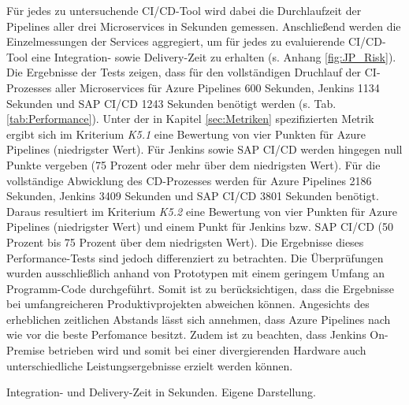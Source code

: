 \vspace*{-15mm}
Für jedes zu untersuchende CI/CD-Tool wird dabei die Durchlaufzeit der Pipelines aller drei Microservices in Sekunden gemessen. Anschließend werden die Einzelmessungen der Services aggregiert, um für jedes zu evaluierende CI/CD-Tool eine Integration- sowie Delivery-Zeit zu erhalten (s. Anhang \ref{fig:JP_Risk}). Die Ergebnisse der Tests zeigen, dass für den vollständigen Druchlauf der CI-Prozesses aller Microservices für Azure Pipelines 600 Sekunden, Jenkins 1134 Sekunden und SAP CI/CD 1243 Sekunden benötigt werden (s. Tab. \ref{tab:Performance}). Unter der in Kapitel \ref{sec:Metriken} spezifizierten Metrik ergibt sich im Kriterium \textit{K5.1} eine Bewertung von vier Punkten für Azure Pipelines (niedrigster Wert). Für Jenkins sowie SAP CI/CD werden hingegen null Punkte vergeben (75 Prozent oder mehr über dem niedrigsten Wert). Für die vollständige Abwicklung des CD-Prozesses werden für Azure Pipelines 2186 Sekunden, Jenkins 3409 Sekunden und SAP CI/CD 3801 Sekunden benötigt. Daraus resultiert im Kriterium \textit{K5.2} eine Bewertung von vier Punkten für Azure Pipelines (niedrigster Wert) und einem Punkt für Jenkins bzw. SAP CI/CD (50 Prozent bis 75 Prozent über dem niedrigsten Wert). Die Ergebnisse dieses Performance-Tests sind jedoch differenziert zu betrachten. Die Überprüfungen wurden ausschließlich anhand von Prototypen mit einem geringem Umfang an Programm-Code durchgeführt. Somit ist zu berücksichtigen, dass die Ergebnisse bei umfangreicheren Produktivprojekten abweichen können. Angesichts des erheblichen zeitlichen Abstands lässt sich annehmen, dass Azure Pipelines nach wie vor die beste Perfomance besitzt. Zudem ist zu beachten, dass Jenkins On-Premise betrieben wird und somit bei einer divergierenden Hardware auch unterschiedliche Leistungsergebnisse erzielt werden können.
\begin{center}
	\begin{table}[H]
		\centering
		\caption[Integration- und Delivery-Zeit in Sekunden]{Integration- und Delivery-Zeit in Sekunden. Eigene Darstellung.}
		\label{tab:Performance}
	\end{table}
\end{center}
\vspace*{-15mm}
